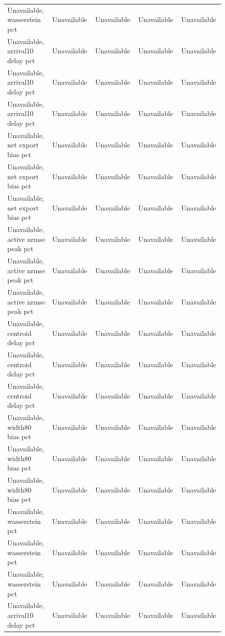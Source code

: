 \begin{longtable}{p{0.1760\linewidth}p{0.1760\linewidth}p{0.1760\linewidth}p{0.1760\linewidth}p{0.1760\linewidth}}
Unavailable, wasserstein pct & Unavailable & Unavailable & Unavailable & Unavailable \\
Unavailable, arrival10 delay pct & Unavailable & Unavailable & Unavailable & Unavailable \\
Unavailable, arrival10 delay pct & Unavailable & Unavailable & Unavailable & Unavailable \\
Unavailable, arrival10 delay pct & Unavailable & Unavailable & Unavailable & Unavailable \\
Unavailable, net export bias pct & Unavailable & Unavailable & Unavailable & Unavailable \\
Unavailable, net export bias pct & Unavailable & Unavailable & Unavailable & Unavailable \\
Unavailable, net export bias pct & Unavailable & Unavailable & Unavailable & Unavailable \\
Unavailable, active nrmse peak pct & Unavailable & Unavailable & Unavailable & Unavailable \\
Unavailable, active nrmse peak pct & Unavailable & Unavailable & Unavailable & Unavailable \\
Unavailable, active nrmse peak pct & Unavailable & Unavailable & Unavailable & Unavailable \\
Unavailable, centroid delay pct & Unavailable & Unavailable & Unavailable & Unavailable \\
Unavailable, centroid delay pct & Unavailable & Unavailable & Unavailable & Unavailable \\
Unavailable, centroid delay pct & Unavailable & Unavailable & Unavailable & Unavailable \\
Unavailable, width80 bias pct & Unavailable & Unavailable & Unavailable & Unavailable \\
Unavailable, width80 bias pct & Unavailable & Unavailable & Unavailable & Unavailable \\
Unavailable, width80 bias pct & Unavailable & Unavailable & Unavailable & Unavailable \\
Unavailable, wasserstein pct & Unavailable & Unavailable & Unavailable & Unavailable \\
Unavailable, wasserstein pct & Unavailable & Unavailable & Unavailable & Unavailable \\
Unavailable, wasserstein pct & Unavailable & Unavailable & Unavailable & Unavailable \\
Unavailable, arrival10 delay pct & Unavailable & Unavailable & Unavailable & Unavailable \\

\end{longtable}
